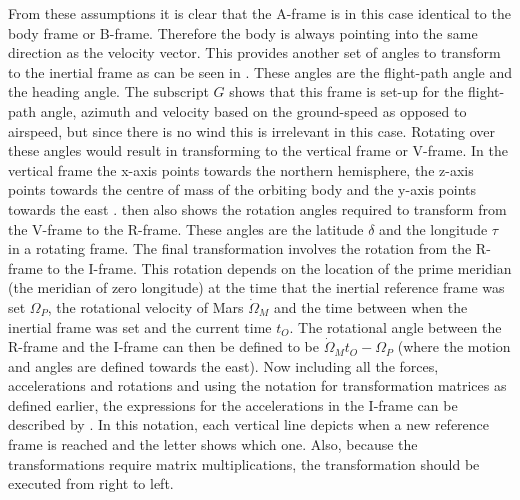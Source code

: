 From these assumptions it is clear that the A-frame is in this case identical to the body frame or B-frame. Therefore the body is always pointing into the same direction as the velocity vector. This provides another set of angles to transform to the inertial frame as can be seen in . These angles are the flight-path angle and the heading angle. The subscript $G$ shows that this frame is set-up for the flight-path angle, azimuth and velocity based on the ground-speed as opposed to airspeed, but since there is no wind this is irrelevant in this case. Rotating over these angles would result in transforming to the vertical frame or V-frame. In the vertical frame the x-axis points towards the northern hemisphere, the z-axis points towards the centre of mass of the orbiting body and the y-axis points towards the east \cite{mooij1994motion}.  then also shows the rotation angles required to transform from the V-frame to the R-frame. These angles are the latitude $\delta$ and the longitude $\tau$ in a rotating frame. The final transformation involves the rotation from the R-frame to the I-frame. This rotation depends on the location of the prime meridian (the meridian of zero longitude) at the time that the inertial reference frame was set $\Omega_{P}$, the rotational velocity of Mars $\dot{\Omega}_{M}$ and the time between when the inertial frame was set and the current time $t_{O}$. The rotational angle between the R-frame and the I-frame can then be defined to be $\dot{\Omega}_{M}t_{O}-\Omega_{P}$ (where the motion and angles are defined towards the east). 
Now including all the forces, accelerations and rotations and using the notation for transformation matrices as defined earlier, the expressions for the accelerations in the I-frame can be described by . In this notation, each vertical line depicts when a new reference frame is reached and the letter shows which one. Also, because the transformations require matrix multiplications, the transformation should be executed from right to left.




